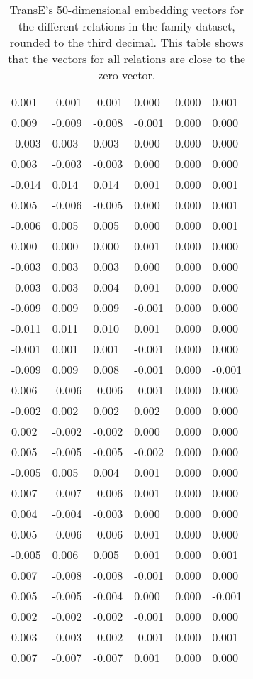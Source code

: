 \begin{longtable}{llllll}
0.001  & -0.001 & -0.001 & 0.000    & 0.000   & 0.001  \\
0.009  & -0.009 & -0.008 & -0.001   & 0.000   & 0.000  \\
-0.003 & 0.003  & 0.003  & 0.000    & 0.000   & 0.000  \\
0.003  & -0.003 & -0.003 & 0.000    & 0.000   & 0.000  \\
-0.014 & 0.014  & 0.014  & 0.001    & 0.000   & 0.001  \\
0.005  & -0.006 & -0.005 & 0.000    & 0.000   & 0.001  \\
-0.006 & 0.005  & 0.005  & 0.000    & 0.000   & 0.001  \\
0.000  & 0.000  & 0.000  & 0.001    & 0.000   & 0.000  \\
-0.003 & 0.003  & 0.003  & 0.000    & 0.000   & 0.000  \\
-0.003 & 0.003  & 0.004  & 0.001    & 0.000   & 0.000  \\
-0.009 & 0.009  & 0.009  & -0.001   & 0.000   & 0.000  \\
-0.011 & 0.011  & 0.010  & 0.001    & 0.000   & 0.000  \\
-0.001 & 0.001  & 0.001  & -0.001   & 0.000   & 0.000  \\
-0.009 & 0.009  & 0.008  & -0.001   & 0.000   & -0.001 \\
0.006  & -0.006 & -0.006 & -0.001   & 0.000   & 0.000  \\
-0.002 & 0.002  & 0.002  & 0.002    & 0.000   & 0.000  \\
0.002  & -0.002 & -0.002 & 0.000    & 0.000   & 0.000  \\
0.005  & -0.005 & -0.005 & -0.002   & 0.000   & 0.000  \\
-0.005 & 0.005  & 0.004  & 0.001    & 0.000   & 0.000  \\
0.007  & -0.007 & -0.006 & 0.001    & 0.000   & 0.000  \\
0.004  & -0.004 & -0.003 & 0.000    & 0.000   & 0.000  \\
0.005  & -0.006 & -0.006 & 0.001    & 0.000   & 0.000  \\
-0.005 & 0.006  & 0.005  & 0.001    & 0.000   & 0.001  \\
0.007  & -0.008 & -0.008 & -0.001   & 0.000   & 0.000  \\
0.005  & -0.005 & -0.004 & 0.000    & 0.000   & -0.001 \\
0.002  & -0.002 & -0.002 & -0.001   & 0.000   & 0.000  \\
0.003  & -0.003 & -0.002 & -0.001   & 0.000   & 0.001  \\
0.007  & -0.007 & -0.007 & 0.001    & 0.000   & 0.000  \\ \hline
\caption{TransE's 50-dimensional embedding vectors for the different relations in the family dataset, rounded to the third decimal. This table shows that the vectors for all relations are close to the zero-vector.}
\label{TransE_embedding_family}
\end{longtable}

